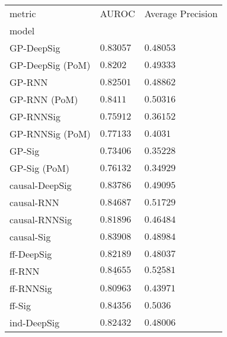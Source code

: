 \begin{tabular}{lll}
\toprule
metric &                                 AUROC &                     Average Precision \\
model            &                                       &                                       \\
\midrule
GP-DeepSig       &                           $ 0.83057 $ &                           $ 0.48053 $ \\
GP-DeepSig (PoM) &                            $ 0.8202 $ &                           $ 0.49333 $ \\
GP-RNN           &                           $ 0.82501 $ &                           $ 0.48862 $ \\
GP-RNN (PoM)     &                            $ 0.8411 $ &                           $ 0.50316 $ \\
GP-RNNSig        &                           $ 0.75912 $ &                           $ 0.36152 $ \\
GP-RNNSig (PoM)  &                           $ 0.77133 $ &                            $ 0.4031 $ \\
GP-Sig           &                           $ 0.73406 $ &                           $ 0.35228 $ \\
GP-Sig (PoM)     &                           $ 0.76132 $ &                           $ 0.34929 $ \\
causal-DeepSig   &                           $ 0.83786 $ &                           $ 0.49095 $ \\
causal-RNN       &               $  \mathbf{ 0.84687 } $ &               $  \mathbf{ 0.51729 } $ \\
causal-RNNSig    &                           $ 0.81896 $ &                           $ 0.46484 $ \\
causal-Sig       &                           $ 0.83908 $ &                           $ 0.48984 $ \\
ff-DeepSig       &                           $ 0.82189 $ &                           $ 0.48037 $ \\
ff-RNN           &            $  \underline{ 0.84655 } $ &  $  \mathbf{ \underline{ 0.52581 }} $ \\
ff-RNNSig        &                           $ 0.80963 $ &                           $ 0.43971 $ \\
ff-Sig           &                           $ 0.84356 $ &                            $ 0.5036 $ \\
ind-DeepSig      &                           $ 0.82432 $ &                           $ 0.48006 $ \\

\end{tabular}
